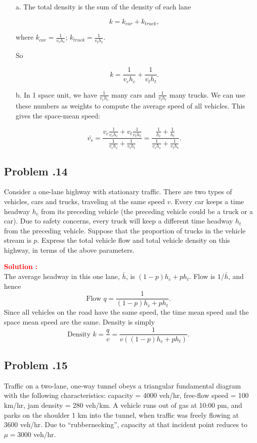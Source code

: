 \documentclass[12pt]{article}
\newcommand{\customsubsection}[1]{
  \subsection*{Problem \thesection.#1}
}
\begin{document}
\begin{itemize}
    \item [a.] The total density is the sum of the density of each lane

\[
k = k_{car} + k_{truck},
\]

where \(k_{car} = \frac{1}{v_c h_c}\); \(k_{truck} = \frac{1}{v_t h_t}\).

So 

\[
k = \frac{1}{v_c h_c} + \frac{1}{v_t h_t}.
\]

\item  [b.] In 1 space unit, we have \(\frac{1}{v_c h_c}\) many cars and \(\frac{1}{v_t h_t}\) many trucks. We can use these numbers as weights to compute the average speed of all vehicles. This gives the space-mean speed:

\[
\bar{v_s} = \frac{v_c \frac{1}{v_c h_c} + v_t \frac{1}{v_t h_t}}{\frac{1}{v_c h_c} + \frac{1}{v_t h_t}} = \frac{\frac{1}{h_c} + \frac{1}{h_t}}{\frac{1}{v_c h_c} + \frac{1}{v_t h_t}}.
\]
\end{itemize}


\newpage

\customsubsection{14}
Consider a one-lane highway with stationary traffic. There are two types of vehicles, cars and trucks, traveling at the same speed $v$. Every car keeps a time headway $h_c$ from its preceding vehicle (the preceding vehicle could be a truck or a car). Due to safety concerns, every truck will keep a different time headway $h_t$ from the preceding vehicle. 
Suppose that the proportion of trucks in the vehicle stream is $p$. Express the total vehicle flow and total vehicle density on this highway, in terms of the above parameters.


\textbf{\textcolor{red}{Solution :}} \\
The average headway in this one lane, \(\bar{h}\), is \((1-p)h_c+ph_t\). Flow is \(1/\bar{h}\), and hence
\[
\text{Flow } q = \frac{1}{(1-p)h_c + ph_t}.
\]
Since all vehicles on the road have the same speed, the time mean speed and the space mean speed are the same. Density is simply
\[
\text{Density } k = \frac{q}{v}= \frac{1}{v((1-p)h_c + ph_t)}.
\]

\newpage

\customsubsection{15}
Traffic on a two-lane, one-way tunnel obeys a triangular fundamental diagram with the following characteristics: capacity = 4000 veh/hr, free-flow speed = 100 km/hr, jam density = 280 veh/km. A vehicle runs out of gas at 10:00 pm, and parks on the shoulder 1 km into the tunnel, when traffic was freely flowing at 3600 veh/hr. Due to “rubbernecking”, capacity at that incident point reduces to $\mu = 3000$ veh/hr.
\end{document}
